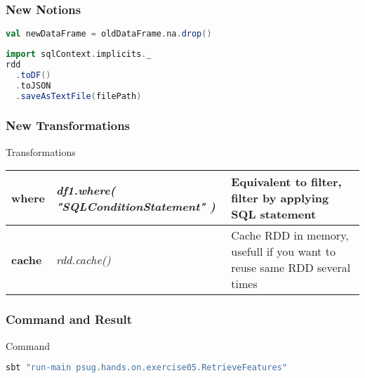 \documentclass[slidetop,9pt,utf8]{beamer}
\begin{document}
\begin{CJK}{UTF8}{gbsn}
\begin{frame}[fragile]
\end{frame}

\begin{frame}[fragile]
  \frametitle{New Notions}

  \begin{lstlisting}[label=DropNullValue, caption=Drop rows containing null values, language=scala, style=code]
val newDataFrame = oldDataFrame.na.drop()
  \end{lstlisting}

  \begin{lstlisting}[label=SaveJsonFile, caption=Save RDD to JSON File, language=scala, style=code]
import sqlContext.implicits._
rdd
  .toDF()
  .toJSON
  .saveAsTextFile(filePath)
  \end{lstlisting}

\end{frame}

\begin{frame}

  \frametitle{New Transformations}

  \begin{block}{Transformations}
    \begin{center}
      \begin{tabular}{|m{2.1cm}|m{3.5cm}|m{5cm}|}
        \hline 
        \textbf{where} & \textit{df1.where( \newline  "SQLConditionStatement" \newline )} & Equivalent to filter, filter by applying SQL statement \\ \hline
        \textbf{cache} & \textit{rdd.cache()} & Cache RDD in memory, usefull if you want to reuse same RDD several times \\ \hline
      \end{tabular}
    \end{center}
  \end{block}

\end{frame}

\begin{frame}[fragile]
  \frametitle{Command and Result}

  \begin{block}{Command}
    \begin{lstlisting}[language=bash, style=terminal]
sbt "run-main psug.hands.on.exercise05.RetrieveFeatures"
    \end{lstlisting}
  \end{block}


\end{frame}
\end{CJK}
\end{document}
